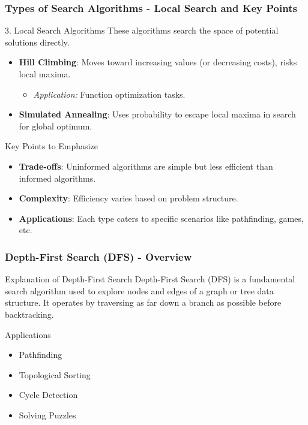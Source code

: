 \documentclass[aspectratio=169]{beamer}
\begin{document}
\begin{frame}[fragile]
    \frametitle{Types of Search Algorithms - Local Search and Key Points}
    \begin{block}{3. Local Search Algorithms}
        These algorithms search the space of potential solutions directly.
        \begin{itemize}
            \item \textbf{Hill Climbing}: Moves toward increasing values (or decreasing costs), risks local maxima.
                \begin{itemize}
                    \item \textit{Application:} Function optimization tasks.
                \end{itemize}
            \item \textbf{Simulated Annealing}: Uses probability to escape local maxima in search for global optimum.
        \end{itemize}
    \end{block}

    \begin{block}{Key Points to Emphasize}
        \begin{itemize}
            \item \textbf{Trade-offs}: Uninformed algorithms are simple but less efficient than informed algorithms.
            \item \textbf{Complexity}: Efficiency varies based on problem structure.
            \item \textbf{Applications}: Each type caters to specific scenarios like pathfinding, games, etc.
        \end{itemize}
    \end{block}
\end{frame}

\begin{frame}
    \frametitle{Depth-First Search (DFS) - Overview}
    \begin{block}{Explanation of Depth-First Search}
        Depth-First Search (DFS) is a fundamental search algorithm used to explore nodes and edges of a graph or tree data structure. It operates by traversing as far down a branch as possible before backtracking.
    \end{block}
    
    \begin{block}{Applications}
        \begin{itemize}
            \item Pathfinding
            \item Topological Sorting
            \item Cycle Detection
            \item Solving Puzzles
        \end{itemize}
    \end{block}
\end{frame}
\end{document}
